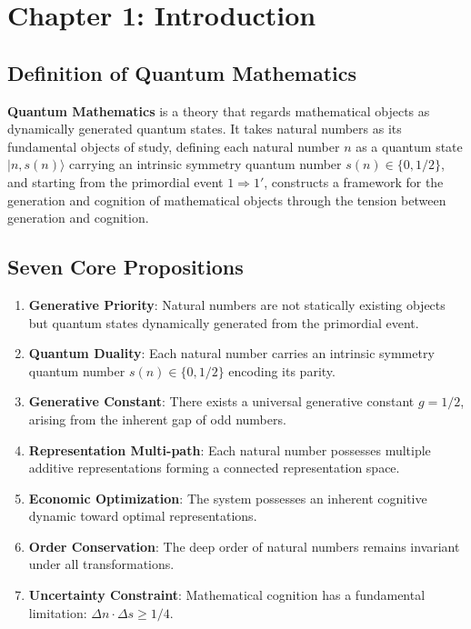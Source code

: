 \documentclass[12pt]{article}
\theoremstyle{definition}
\begin{document}
\newpage


\section{Chapter 1: Introduction}

\subsection{Definition of Quantum Mathematics}

\textbf{Quantum Mathematics} is a theory that regards mathematical objects as dynamically generated quantum states. It takes natural numbers as its fundamental objects of study, defining each natural number \(n\) as a quantum state \(|n, s(n)\rangle\) carrying an intrinsic symmetry quantum number \(s(n) \in \{0, 1/2\}\), and starting from the primordial event \(1 \Rightarrow 1'\), constructs a framework for the generation and cognition of mathematical objects through the tension between generation and cognition.

\subsection{Seven Core Propositions}

\begin{enumerate}
    \item \textbf{Generative Priority}: Natural numbers are not statically existing objects but quantum states dynamically generated from the primordial event.
    \item \textbf{Quantum Duality}: Each natural number carries an intrinsic symmetry quantum number \(s(n) \in \{0, 1/2\}\) encoding its parity.
    \item \textbf{Generative Constant}: There exists a universal generative constant \(g = 1/2\), arising from the inherent gap of odd numbers.
    \item \textbf{Representation Multi-path}: Each natural number possesses multiple additive representations forming a connected representation space.
    \item \textbf{Economic Optimization}: The system possesses an inherent cognitive dynamic toward optimal representations.
    \item \textbf{Order Conservation}: The deep order of natural numbers remains invariant under all transformations.
    \item \textbf{Uncertainty Constraint}: Mathematical cognition has a fundamental limitation: \(\Delta n \cdot \Delta s \geq 1/4\).
\end{enumerate}
\end{document}
